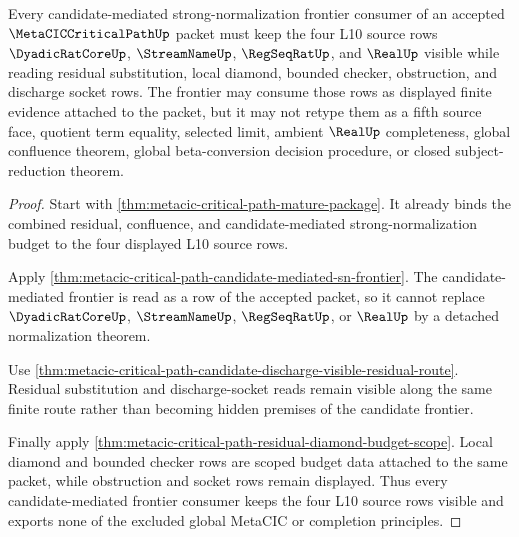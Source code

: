 \begin{theorem}
\label{thm:metacic-critical-path-l10-source-candidate-frontier}
Every candidate-mediated strong-normalization frontier consumer of an accepted $\MetaCICCriticalPathUp$ packet must keep the four L10 source rows $\DyadicRatCoreUp$, $\StreamNameUp$, $\RegSeqRatUp$, and $\RealUp$ visible while reading residual substitution, local diamond, bounded checker, obstruction, and discharge socket rows. The frontier may consume those rows as displayed finite evidence attached to the packet, but it may not retype them as a fifth source face, quotient term equality, selected limit, ambient $\RealUp$ completeness, global confluence theorem, global beta-conversion decision procedure, or closed subject-reduction theorem.
\end{theorem}
\begin{proof}
Start with \autoref{thm:metacic-critical-path-mature-package}. It already binds the combined residual, confluence, and candidate-mediated strong-normalization budget to the four displayed L10 source rows.

Apply \autoref{thm:metacic-critical-path-candidate-mediated-sn-frontier}. The candidate-mediated frontier is read as a row of the accepted packet, so it cannot replace $\DyadicRatCoreUp$, $\StreamNameUp$, $\RegSeqRatUp$, or $\RealUp$ by a detached normalization theorem.

Use \autoref{thm:metacic-critical-path-candidate-discharge-visible-residual-route}. Residual substitution and discharge-socket reads remain visible along the same finite route rather than becoming hidden premises of the candidate frontier.

Finally apply \autoref{thm:metacic-critical-path-residual-diamond-budget-scope}. Local diamond and bounded checker rows are scoped budget data attached to the same packet, while obstruction and socket rows remain displayed. Thus every candidate-mediated frontier consumer keeps the four L10 source rows visible and exports none of the excluded global MetaCIC or completion principles.
\end{proof}


